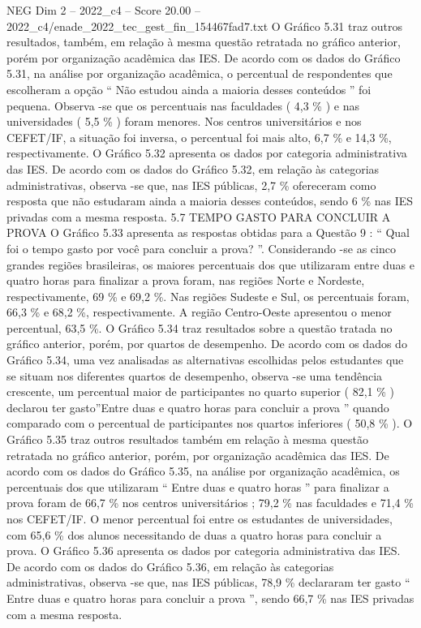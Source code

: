 \begin{textsample}{NEG Dim 2 – 2022\_c4 – Score 20.00 – 2022\_c4/enade\_2022\_tec\_gest\_fin\_154467fad7.txt}
O Gráfico 5.31 traz outros resultados, também, em relação à mesma questão retratada no gráfico anterior, porém por organização acadêmica das IES.
De acordo com os dados do Gráfico 5.31, na análise por organização acadêmica, o percentual de respondentes que escolheram a opção “ Não estudou ainda a maioria desses conteúdos ” foi pequena.
Observa -se que os percentuais nas faculdades ( 4,3 \% ) e nas universidades ( 5,5 \% ) foram menores.
Nos centros universitários e nos CEFET/IF, a situação foi inversa, o percentual foi mais alto, 6,7 \% e 14,3 \%, respectivamente.
O Gráfico 5.32 apresenta os dados por categoria administrativa das IES.
De acordo com os dados do Gráfico 5.32, em relação às categorias administrativas, observa -se que, nas IES públicas, 2,7 \% ofereceram como resposta que não estudaram ainda a maioria desses conteúdos, sendo 6 \% nas IES privadas com a mesma resposta. 5.7 TEMPO GASTO PARA CONCLUIR A PROVA O Gráfico 5.33 apresenta as respostas obtidas para a Questão 9 : “ Qual foi o tempo gasto por você para concluir a prova? ”.
Considerando -se as cinco grandes regiões brasileiras, os maiores percentuais dos que utilizaram entre duas e quatro horas para finalizar a prova foram, nas regiões Norte e Nordeste, respectivamente, 69 \% e 69,2 \%.
Nas regiões Sudeste e Sul, os percentuais foram, 66,3 \% e 68,2 \%, respectivamente.
A região Centro-Oeste apresentou o menor percentual, 63,5 \%.
O Gráfico 5.34 traz resultados sobre a questão tratada no gráfico anterior, porém, por quartos de desempenho.
De acordo com os dados do Gráfico 5.34, uma vez analisadas as alternativas escolhidas pelos estudantes que se situam nos diferentes quartos de desempenho, observa -se uma tendência crescente, um percentual maior de participantes no quarto superior ( 82,1 \% ) declarou ter gasto”Entre duas e quatro horas para concluir a prova ” quando comparado com o percentual de participantes nos quartos inferiores ( 50,8 \% ).
O Gráfico 5.35 traz outros resultados também em relação à mesma questão retratada no gráfico anterior, porém, por organização acadêmica das IES.
De acordo com os dados do Gráfico 5.35, na análise por organização acadêmica, os percentuais dos que utilizaram “ Entre duas e quatro horas ” para finalizar a prova foram de 66,7 \% nos centros universitários ; 79,2 \% nas faculdades e 71,4 \% nos CEFET/IF.
O menor percentual foi entre os estudantes de universidades, com 65,6 \% dos alunos necessitando de duas a quatro horas para concluir a prova.
O Gráfico 5.36 apresenta os dados por categoria administrativa das IES.
De acordo com os dados do Gráfico 5.36, em relação às categorias administrativas, observa -se que, nas IES públicas, 78,9 \% declararam ter gasto “ Entre duas e quatro horas para concluir a prova ”, sendo 66,7 \% nas IES privadas com a mesma resposta.

\end{textsample}
